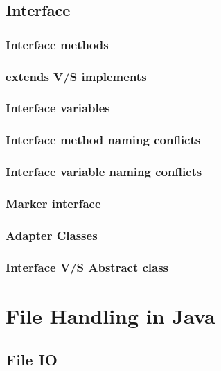 \documentclass[14pt,fleqn]{extbook} %
\begin{document}
\section{Interface}

\subsection{Interface methods}

\subsection{extends V/S implements}

\subsection{Interface variables}

\subsection{Interface method naming conflicts}

\subsection{Interface variable naming conflicts}

\subsection{Marker interface}

\subsection{Adapter Classes}

\subsection{Interface V/S Abstract class}




\chapter{File Handling in Java}
\section{File IO}

\end{document}

